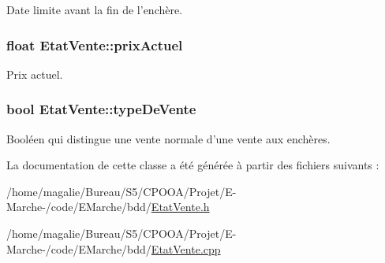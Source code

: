 Date limite avant la fin de l'enchère. 

\hypertarget{class_etat_vente_a69258e9f4890fc1fe84e5afdba35bc0f}{
\subsubsection[{prix\-Actuel}]{\setlength{\rightskip}{0pt plus 5cm}float Etat\-Vente\-::prix\-Actuel\hspace{0.3cm}{\ttfamily [protected]}}}\label{class_etat_vente_a69258e9f4890fc1fe84e5afdba35bc0f}


Prix actuel. 

\hypertarget{class_etat_vente_a6fac909bb6c53a68450ff1f1e287e298}{
\subsubsection[{type\-De\-Vente}]{\setlength{\rightskip}{0pt plus 5cm}bool Etat\-Vente\-::type\-De\-Vente\hspace{0.3cm}{\ttfamily [protected]}}}\label{class_etat_vente_a6fac909bb6c53a68450ff1f1e287e298}


Booléen qui distingue une vente normale d'une vente aux enchères. 



La documentation de cette classe a été générée à partir des fichiers suivants \-:\begin{DoxyCompactItemize}
\item 
/home/magalie/\-Bureau/\-S5/\-C\-P\-O\-O\-A/\-Projet/\-E-\/\-Marche-\//code/\-E\-Marche/bdd/\hyperlink{_etat_vente_8h}{Etat\-Vente.\-h}\item 
/home/magalie/\-Bureau/\-S5/\-C\-P\-O\-O\-A/\-Projet/\-E-\/\-Marche-\//code/\-E\-Marche/bdd/\hyperlink{_etat_vente_8cpp}{Etat\-Vente.\-cpp}\end{DoxyCompactItemize}
